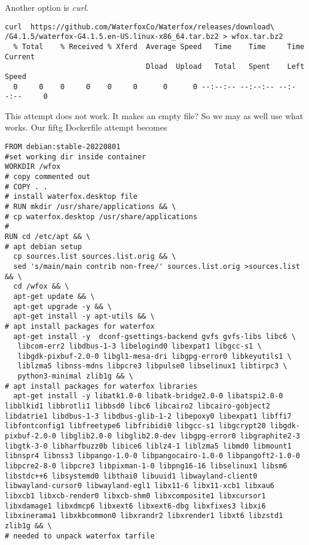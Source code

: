 \documentclass[a4paper]{article}  %
\begin{document}
 Another option is {\em curl}.
\begin{tcolorbox}
\begin{verbatim}
curl  https://github.com/WaterfoxCo/Waterfox/releases/download\
/G4.1.5/waterfox-G4.1.5.en-US.linux-x86_64.tar.bz2 > wfox.tar.bz2
  % Total    % Received % Xferd  Average Speed   Time    Time     Time  Current
                                 Dload  Upload   Total   Spent    Left  Speed
  0     0    0     0    0     0      0      0 --:--:-- --:--:-- --:--:--     0
\end{verbatim}
\end{tcolorbox}
This attempt does not work. It makes an empty file?
So we may as well use what works. Our fiftg Dockerfile attempt becomes
\begin{tcolorbox}
\begin{verbatim}
FROM debian:stable-20220801
#set working dir inside container
WORKDIR /wfox
# copy commented out 
# COPY . .
# install waterfox.desktop file
# RUN mkdir /usr/share/applications && \
# cp waterfox.desktop /usr/share/applications
#
RUN cd /etc/apt && \
# apt debian setup
  cp sources.list sources.list.orig && \
  sed 's/main/main contrib non-free/' sources.list.orig >sources.list && \
  cd /wfox && \
  apt-get update && \
  apt-get upgrade -y && \
  apt-get install -y apt-utils && \
# apt install packages for waterfox
  apt-get install -y  dconf-gsettings-backend gvfs gvfs-libs libc6 \
   libcom-err2 libdbus-1-3 libelogind0 libexpat1 libgcc-s1 \
   libgdk-pixbuf-2.0-0 libgl1-mesa-dri libgpg-error0 libkeyutils1 \
   liblzma5 libnss-mdns libpcre3 libpulse0 libselinux1 libtirpc3 \
   python3-minimal zlib1g && \
# apt install packages for waterfox libraries
  apt-get install -y libatk1.0-0 libatk-bridge2.0-0 libatspi2.0-0 libblkid1 libbrotli1 libbsd0 libc6 libcairo2 libcairo-gobject2 libdatrie1 libdbus-1-3 libdbus-glib-1-2 libepoxy0 libexpat1 libffi7 libfontconfig1 libfreetype6 libfribidi0 libgcc-s1 libgcrypt20 libgdk-pixbuf-2.0-0 libglib2.0-0 libglib2.0-dev libgpg-error0 libgraphite2-3 libgtk-3-0 libharfbuzz0b libice6 liblz4-1 liblzma5 libmd0 libmount1 libnspr4 libnss3 libpango-1.0-0 libpangocairo-1.0-0 libpangoft2-1.0-0 libpcre2-8-0 libpcre3 libpixman-1-0 libpng16-16 libselinux1 libsm6 libstdc++6 libsystemd0 libthai0 libuuid1 libwayland-client0 libwayland-cursor0 libwayland-egl1 libx11-6 libx11-xcb1 libxau6 libxcb1 libxcb-render0 libxcb-shm0 libxcomposite1 libxcursor1 libxdamage1 libxdmcp6 libxext6 libxext6-dbg libxfixes3 libxi6 libxinerama1 libxkbcommon0 libxrandr2 libxrender1 libxt6 libzstd1 zlib1g && \
# needed to unpack waterfox tarfile

\end{verbatim}
\end{tcolorbox}
\end{document}
